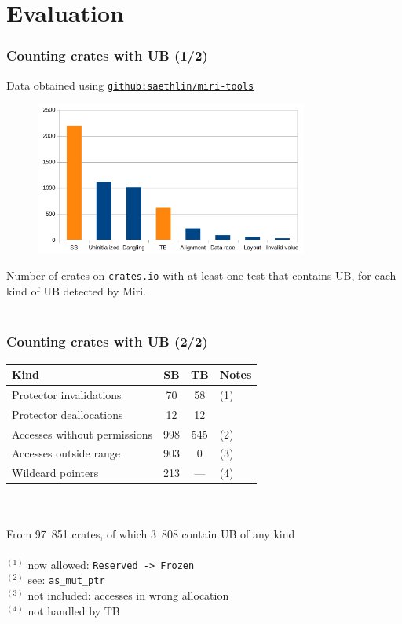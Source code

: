 \section{Evaluation}



\begin{frame}
    \frametitle{Counting crates with UB (1/2)}
    {\footnotesize
    Data obtained using \href{https://github.com/saethlin/miri-tools}{\texttt{github:saethlin/miri-tools}}\\
    }
    \begin{figure}
        \includegraphics[width=0.8\textwidth]{../img/ub-count.png}
    \end{figure}
    {\footnotesize Number of crates on \texttt{crates.io} with at least one test
    that contains UB, for each kind of UB detected by Miri.}\\~\\
\end{frame}

\begin{frame}
    \frametitle{Counting crates with UB (2/2)}
    \begin{tabular}{|l|c|c|l|}
        \hline
        Kind                         &  SB &  TB & Notes\\
        \hline
        Protector invalidations      &  70 &  58 & \tiny(1) \\
        Protector deallocations      &  12 &  12 & \\
        Accesses without permissions & 998 & 545 & \tiny(2) \\
        Accesses outside range       & 903 &   0 & \tiny(3) \\
        Wildcard pointers            & 213 & --- & \tiny(4) \\
        \hline
    \end{tabular}~\\~\\
    From 97~851 crates, of which 3~808 contain UB of any kind\\~\\

    {\footnotesize
    \(^{(1)}\) now allowed: \texttt{Reserved -> Frozen}\\
    \(^{(2)}\) see: \texttt{as\_mut\_ptr}\\
    \(^{(3)}\) not included: accesses in wrong allocation\\
    \(^{(4)}\) not handled by TB\\
    }
\end{frame}

